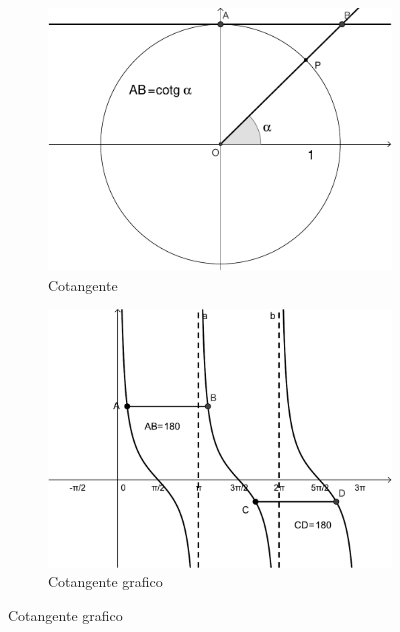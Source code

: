 \begin{figure}
	\begin{subfigure}[b]{.5\linewidth}
		\centering\includegraphics[scale=0.3]{cotgalpha-crop}
		\caption{Cotangente}\label{fig:CotangenteDefinizione}
	\end{subfigure}%
	\begin{subfigure}[b]{.5\linewidth}
		\centering\includegraphics[scale=0.3]{cotgalphagrafico-crop}
		\caption{Cotangente grafico}\label{fig:CotangenteGrafico}
	\end{subfigure}
	\label{tab:funzcotg}
\end{figure}
\begin{figure}
	\centering
	
	\label{fig:AndamentoCotangente1}
\end{figure}%
